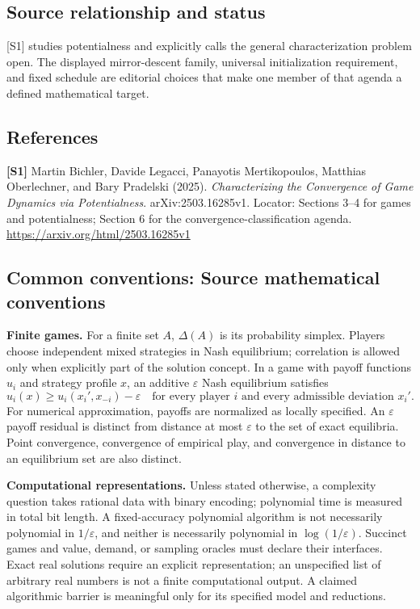 \documentclass[11pt,a4paper]{article}
\begin{document}
\subsection*{Source relationship and status}
[S1] studies potentialness and explicitly calls the general characterization problem open. The displayed mirror-descent family, universal initialization requirement, and fixed schedule are editorial choices that make one member of that agenda a defined mathematical target.
\subsection*{References}
\begingroup\footnotesize\raggedright
{\footnotesize\raggedright
\textbf{[S1]} Martin Bichler, Davide Legacci, Panayotis Mertikopoulos, Matthias Oberlechner, and Bary Pradelski (2025). \emph{Characterizing the Convergence of Game Dynamics via Potentialness}. arXiv:2503.16285v1. Locator: Sections 3--4 for games and potentialness; Section 6 for the convergence-classification agenda. \url{https://arxiv.org/html/2503.16285v1}\par}
\par\endgroup

\subsection*{Common conventions: Source mathematical conventions}

\textbf{Finite games.} For a finite set $A$, $\Delta(A)$ is its probability
simplex. Players choose independent mixed strategies in Nash equilibrium;
correlation is allowed only when explicitly part of the solution concept.
In a game with payoff functions $u_i$ and strategy profile $x$, an additive
$\varepsilon$ Nash equilibrium satisfies
\[
 u_i(x)\geq u_i(x_i',x_{-i})-\varepsilon
 \quad\text{for every player $i$ and every admissible deviation $x_i'$}.
\]
For numerical approximation, payoffs are normalized as locally specified.
An $\varepsilon$ payoff residual is distinct from distance at most
$\varepsilon$ to the set of exact equilibria. Point convergence, convergence
of empirical play, and convergence in distance to an equilibrium set are
also distinct.

\textbf{Computational representations.} Unless stated otherwise, a complexity
question takes rational data with binary encoding; polynomial time is measured
in total bit length. A fixed-accuracy polynomial algorithm is not necessarily
polynomial in $1/\varepsilon$, and neither is necessarily polynomial in
$\log(1/\varepsilon)$. Succinct games and value, demand, or sampling oracles
must declare their interfaces. Exact real solutions require an explicit
representation; an unspecified list of arbitrary real numbers is not a
finite computational output. A claimed algorithmic barrier is meaningful
only for its specified model and reductions.
\end{document}
